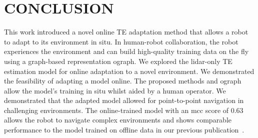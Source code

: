 
\section{CONCLUSION}
This work introduced a novel online TE adaptation method that allows a robot to adapt to its environment in situ. In human-robot collaboration, the robot experiences the environment and can build high-quality training data on the fly using a graph-based representation \ac{ograph}. We explored the lidar-only TE estimation model for online adaptation to a novel environment. We demonstrated the feasibility of adapting a model online. The proposed methods and \ac{ograph} allow the model's training in situ whilst aided by a human operator. We demonstrated that the adapted model allowed for point-to-point navigation in challenging environments. The online-trained model with an \ac{mcc} score of 0.63 allows the robot to navigate complex environments and shows comparable performance to the model trained on offline data in our previous publication~\cite{ruetz2024foresttrav}.

